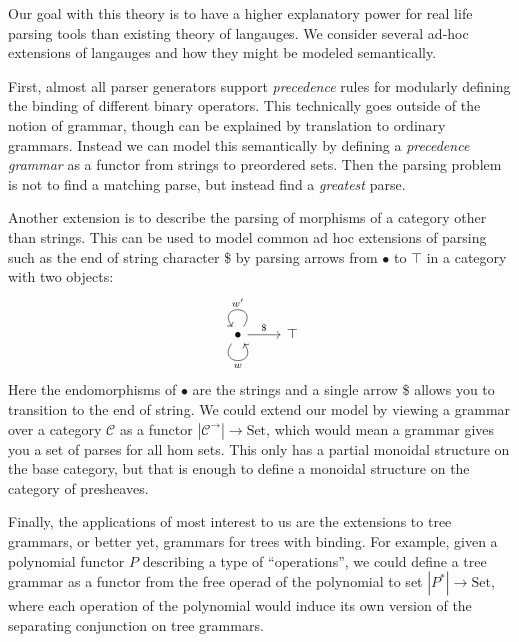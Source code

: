 \documentclass[12pt]{article}
\newcommand{\Set}{\textrm{Set}}
\begin{document}
Our goal with this theory is to have a higher explanatory power for
real life parsing tools than existing theory of langauges. We consider
several ad-hoc extensions of langauges and how they might be modeled
semantically.

First, almost all parser generators support \emph{precedence} rules
for modularly defining the binding of different binary operators.
This technically goes outside of the notion of grammar, though can be
explained by translation to ordinary grammars.
%
Instead we can model this semantically by defining a \emph{precedence
grammar} as a functor from strings to preordered sets. Then the
parsing problem is not to find a matching parse, but instead find a
\emph{greatest} parse.

Another extension is to describe the parsing of morphisms of a
category other than strings. This can be used to model common ad hoc
extensions of parsing such as the end of string character \$ by
parsing arrows from $\bullet$ to $\top$ in a category with two
objects:
\[%
\begin{tikzcd}
\bullet \arrow[r, "\$"] \arrow["w"', loop, distance=2em, in=305, out=235] \arrow["w'"', loop, distance=2em, in=125, out=55] & \top
\end{tikzcd}\]
Here the endomorphisms of $\bullet$ are the strings and a single arrow
\$ allows you to transition to the end of string.  We could extend our
model by viewing a grammar over a category $\mathcal C$ as a functor
$|\mathcal C^\to| \to \Set$, which would mean a grammar gives you a
set of parses for all hom sets. This only has a partial monoidal
structure on the base category, but that is enough to define a
monoidal structure on the category of presheaves.

Finally, the applications of most interest to us are the extensions to
tree grammars, or better yet, grammars for trees with binding. For
example, given a polynomial functor $P$ describing a type of
``operations'', we could define a tree grammar as a functor from the
free operad of the polynomial to set $|P^*| \to \Set$, where each
operation of the polynomial would induce its own version of the
separating conjunction on tree grammars.



\end{document}
